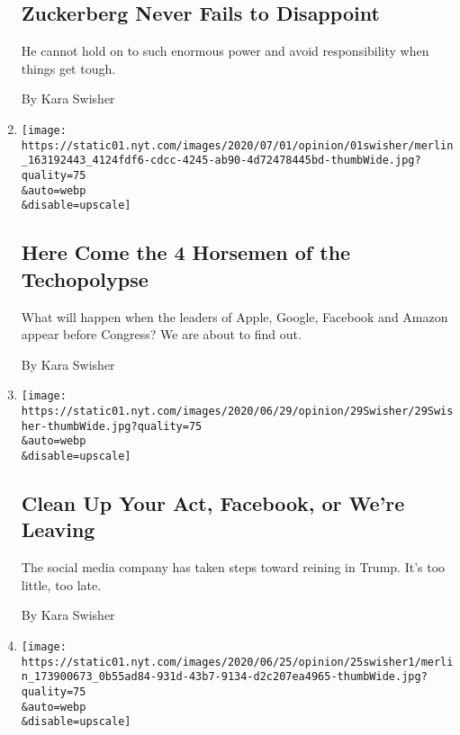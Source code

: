 \begin{enumerate}
{  \subsection{Zuckerberg Never Fails to
  Disappoint}\label{zuckerberg-never-fails-to-disappoint}}

  He cannot hold on to such enormous power and avoid responsibility when
  things get tough.

  By Kara Swisher
\item
  \href{/2020/07/01/opinion/anti-trust-tech-hearing-facebook.html}{}

  \texttt{[image: https://static01.nyt.com/images/2020/07/01/opinion/01swisher/merlin\_163192443\_4124fdf6-cdcc-4245-ab90-4d72478445bd-thumbWide.jpg?quality=75\\\&auto=webp\\\&disable=upscale]}

  \hypertarget{here-come-the-4-horsemen-of-the-techopolypse}{%
  \subsection{Here Come the 4 Horsemen of the
  Techopolypse}\label{here-come-the-4-horsemen-of-the-techopolypse}}

  What will happen when the leaders of Apple, Google, Facebook and
  Amazon appear before Congress? We are about to find out.

  By Kara Swisher
\item
  \href{/2020/06/30/opinion/facebook-zuckerberg-labeling.html}{}

  \texttt{[image: https://static01.nyt.com/images/2020/06/29/opinion/29Swisher/29Swisher-thumbWide.jpg?quality=75\\\&auto=webp\\\&disable=upscale]}

  \hypertarget{clean-up-your-act-facebook-or-were-leaving}{%
  \subsection{Clean Up Your Act, Facebook, or We're
  Leaving}\label{clean-up-your-act-facebook-or-were-leaving}}

  The social media company has taken steps toward reining in Trump. It's
  too little, too late.

  By Kara Swisher
\item
  \href{/2020/06/25/opinion/robinhood-suicide-trading.html}{}

  \texttt{[image: https://static01.nyt.com/images/2020/06/25/opinion/25swisher1/merlin\_173900673\_0b55ad84-931d-43b7-9134-d2c207ea4965-thumbWide.jpg?quality=75\\\&auto=webp\\\&disable=upscale]}


\end{enumerate}
